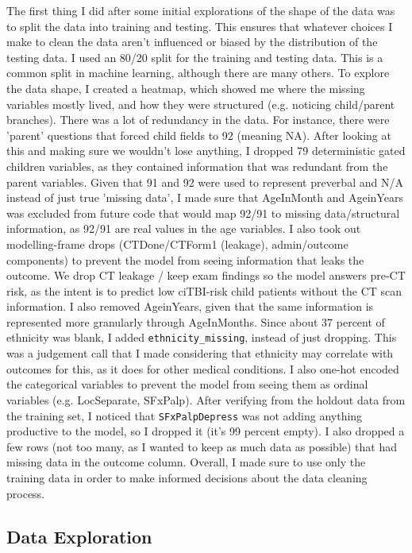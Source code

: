 \documentclass[10pt,letterpaper]{article}
\begin{document}
The first thing I did after some initial explorations of the shape of the data was to split the data into training and testing. This ensures that whatever choices I make to clean the data aren't influenced or biased by the distribution of the testing data.
I used an 80/20 split for the training and testing data. This is a common split in machine learning, although there are many others.
To explore the data shape, I created a heatmap, which showed me where the missing variables mostly lived, and how they were structured (e.g. noticing child/parent branches).
There was a lot of redundancy in the data. For instance, there were 'parent' questions that forced child fields to 92 (meaning NA). After looking at this and making sure we wouldn't lose anything, I dropped 79 deterministic gated children variables, as they contained information that was redundant from the parent variables.
Given that 91 and 92 were used to represent preverbal and N/A instead of just true 'missing data', I made sure that AgeInMonth and AgeinYears was excluded from future code that would map 92/91 to missing data/structural information, as 92/91 are real values in the age variables.
I also took out modelling-frame drops (CTDone/CTForm1 (leakage), admin/outcome components) to prevent the model from seeing information that leaks the outcome. We drop CT leakage / keep exam findings so the model answers pre-CT risk, as the intent is to predict low ciTBI-risk child patients without the CT scan information. I also removed AgeinYears, given that the same information is represented more granularly through AgeInMonths.
Since about 37 percent of ethnicity was blank, I added \texttt{ethnicity\_missing}, instead of just dropping. This was a judgement call that I made considering that ethnicity may correlate with outcomes for this, as it does for other medical conditions.
I also one-hot encoded the categorical variables to prevent the model from seeing them as ordinal variables (e.g. LocSeparate, SFxPalp).
After verifying from the holdout data from the training set, I noticed that \texttt{SFxPalpDepress} was not adding anything productive to the model, so I dropped it (it's 99 percent empty).
I also dropped a few rows (not too many, as I wanted to keep as much data as possible) that had missing data in the outcome column.
Overall, I made sure to use only the training data in order to make informed decisions about the data cleaning process.

\subsection{Data Exploration}\label{data-exploration}
\end{document}
